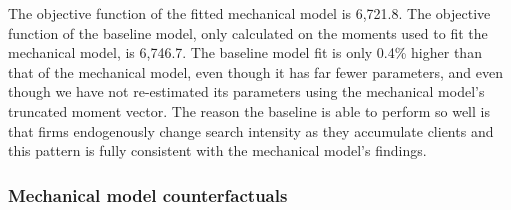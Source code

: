 \documentclass[12pt]{article} \usepackage{amsmath,amssymb,amsthm,geometry,graphicx,setspace,algorithm,algpseudocode,float}
\begin{document}
The objective function of the fitted mechanical model is 6,721.8.  The objective function of the baseline model, only calculated on the moments used to fit the mechanical model, is 6,746.7.  The baseline model fit is only 0.4\% higher than that of the mechanical model, even though it has far fewer parameters, and even though we have not re-estimated its parameters using the mechanical model's truncated moment vector.  The reason the baseline is able to perform so well is that firms endogenously change search intensity as they accumulate clients and this pattern is fully consistent with the mechanical model's findings.

\subsubsection{Mechanical model counterfactuals}
\end{document}
